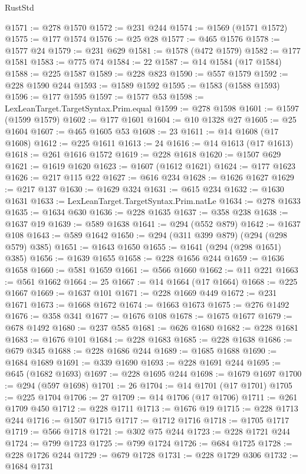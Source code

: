 \begin{lexlean}{RustStd}
\begin{coremodule}
@1571 := @278 @1570
@1572 := @231 @244
@1574 := @1569 (@1571 @1572)
@1575 := @177 @1574
@1576 := @25 @28
@1577 := @465 @1576
@1578 := @1577 @24
@1579 := @231 @629
@1581 := @1578 (@472 @1579)
@1582 := @177 @1581
@1583 := @775 @74
@1584 := 22
@1587 := @14 @1584 (@17 @1584)
@1588 := @225 @1587
@1589 := @228 @823
@1590 := @557 @1579
@1592 := @228 @1590 @244
@1593 := @1589 @1592
@1595 := @1583 (@1588 @1593)
@1596 := @177 @1595
@1597 := @1577 @53
@1598 := LexLeanTarget.TargetSyntax.Prim.equal
@1599 := @278 @1598
@1601 := @1597 (@1599 @1579)
@1602 := @177 @1601
@1604 := @10 @1328 @27
@1605 := @25 @1604
@1607 := @465 @1605 @53
@1608 := 23
@1611 := @14 @1608 (@17 @1608)
@1612 := @225 @1611
@1613 := 24
@1616 := @14 @1613 (@17 @1613)
@1618 := @261 @1616 @1572
@1619 := @228 @1618
@1620 := @1507 @629
@1621 := @1619 @1620
@1623 := @1607 (@1612 @1621)
@1624 := @177 @1623
@1626 := @217 @115 @22
@1627 := @616 @234
@1628 := @1626 @1627
@1629 := @217 @137
@1630 := @1629 @324
@1631 := @615 @234
@1632 := @1630 @1631
@1633 := LexLeanTarget.TargetSyntax.Prim.natLe
@1634 := @278 @1633
@1635 := @1634 @630
@1636 := @228 @1635
@1637 := @358 @238
@1638 := @1637 @19
@1639 := @589 @1638
@1641 := @294 (@552 @879)
@1642 := @1637 @108
@1643 := @589 @1642
@1650 := @294 (@311 @399 @879) (@294 (@298 @579) @385)
@1651 := @1643 @1650
@1655 := @1641 (@294 (@298 @1651) @385)
@1656 := @1639 @1655
@1658 := @228 @1656 @244
@1659 := @1636 @1658
@1660 := @581 @1659
@1661 := @566 @1660
@1662 := @11 @221
@1663 := @561 @1662
@1664 := 25
@1667 := @14 @1664 (@17 @1664)
@1668 := @225 @1667
@1669 := @1637 @101
@1671 := @228 @1669 @449
@1672 := @231 @1671
@1673 := @1668 @1672
@1674 := @1663 @1673
@1675 := @276 @1492
@1676 := @358 @341
@1677 := @1676 @108
@1678 := @1675 @1677
@1679 := @678 @1492
@1680 := @237 @585
@1681 := @626 @1680
@1682 := @228 @1681
@1683 := @1676 @101
@1684 := @228 @1683
@1685 := @228 @1638
@1686 := @679 @345
@1688 := @228 @1686 @244
@1689 := @1685 @1688
@1690 := @1684 @1689
@1691 := @339 @1690
@1693 := @228 @1691 @244
@1695 := @645 (@1682 @1693)
@1697 := @228 @1695 @244
@1698 := @1679 @1697
@1700 := @294 (@597 @1698)
@1701 := 26
@1704 := @14 @1701 (@17 @1701)
@1705 := @225 @1704
@1706 := 27
@1709 := @14 @1706 (@17 @1706)
@1711 := @261 @1709 @450
@1712 := @228 @1711
@1713 := @1676 @19
@1715 := @228 @1713 @244
@1716 := @1507 @1715
@1717 := @1712 @1716
@1718 := @1705 @1717
@1719 := @566 @1718
@1721 := @302 @75 @244
@1723 := @228 @1721 @244
@1724 := @799 @1723
@1725 := @799 @1724
@1726 := @684 @1725
@1728 := @228 @1726 @244
@1729 := @679 @1728
@1731 := @228 @1729 @306
@1732 := @1684 @1731

\end{coremodule}
\end{lexlean}
